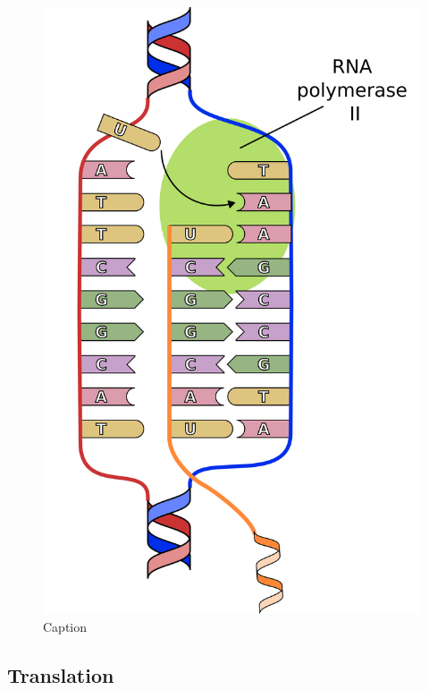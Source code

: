 \begin{figure}[hbtp]
    \includegraphics[height=0.9\textheight]{ch1.Introduction/imgs/transcription.png}
    \caption{Caption}
    \label{fig:transcription}
\end{figure}

\subsection{Translation}

